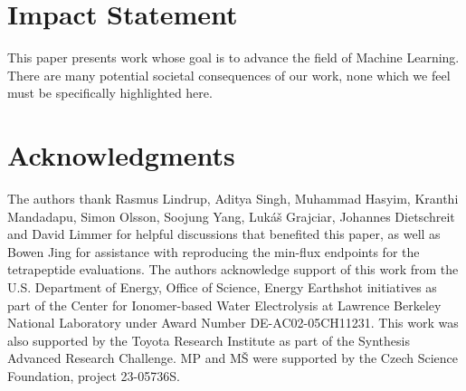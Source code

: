 \documentclass{article}
\theoremstyle{plain}
\theoremstyle{definition}
\theoremstyle{remark}
\begin{document}
\printAffiliationsAndNotice{\icmlEqualContribution} %


% 






% 
\newpage
\section*{Impact Statement} This paper presents work whose goal is to advance the field of Machine Learning. There are many potential societal consequences of our work, none which we feel must be specifically highlighted here.
\section*{Acknowledgments}
The authors thank Rasmus Lindrup, Aditya Singh, Muhammad Hasyim, Kranthi Mandadapu, Simon Olsson, Soojung Yang, Lukáš Grajciar, Johannes Dietschreit and David Limmer for helpful discussions that benefited this paper, as well as Bowen Jing for assistance with reproducing the min-flux endpoints for the tetrapeptide evaluations. The authors acknowledge support of this work from the U.S. Department of Energy, Office of Science, Energy Earthshot initiatives as part of the Center for Ionomer-based Water Electrolysis at Lawrence Berkeley National Laboratory under Award Number DE-AC02-05CH11231. This work was also supported by the Toyota Research Institute as part of the Synthesis Advanced Research Challenge.  MP and MŠ were supported by the Czech Science Foundation, project 23-05736S.




\newpage
\appendix
\onecolumn




\end{document}
